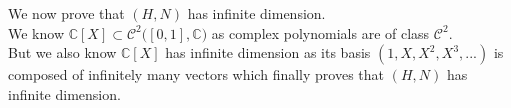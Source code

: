 \documentclass{article}
\begin{document}
\noindent We now prove that $(H, N)$ has infinite dimension. \\
We know $\mathbb{C}[X] \subset \mathcal{C}^2\big( [0,1] , \mathbb{C} \big)$ as complex polynomials are of class $\mathcal{C}^2$. \\
But we also know $\mathbb{C}[X]$ has infinite dimension as its basis $(1, X, X^2, X^3, ...)$ is composed of infinitely many vectors which finally proves that $(H, N)$ has infinite dimension. 
\end{document}
